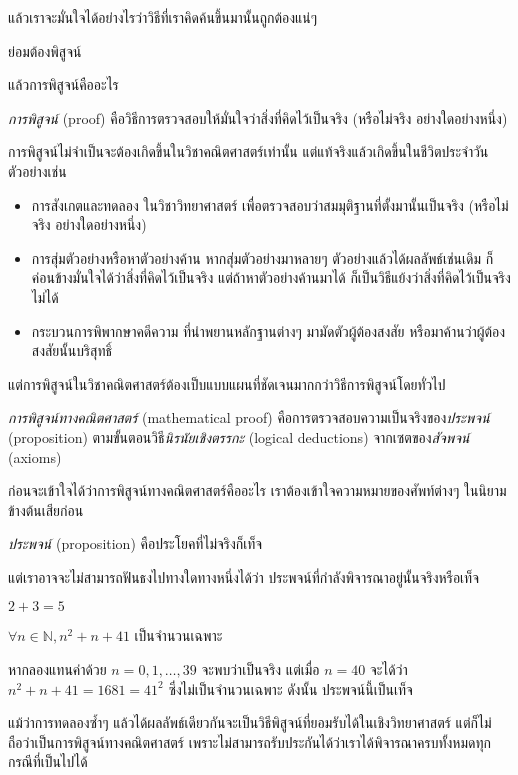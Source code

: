 แล้วเราจะมั่นใจได้อย่างไรว่าวิธีที่เราคิดค้นขึ้นมานั้นถูกต้องแน่ๆ

ย่อมต้องพิสูจน์

แล้วการพิสูจน์คืออะไร

\begin{definition}
\emph{การพิสูจน์} (proof) คือวิธีการตรวจสอบให้มั่นใจว่าสิ่งที่คิดไว้เป็นจริง (หรือไม่จริง อย่างใดอย่างหนึ่ง)
\end{definition}

การพิสูจน์ไม่จำเป็นจะต้องเกิดขึ้นในวิชาคณิตศาสตร์เท่านั้น แต่แท้จริงแล้วเกิดขึ้นในชีวิตประจำวัน ตัวอย่างเช่น
\begin{itemize}
\item การสังเกตและทดลอง ในวิชาวิทยาศาสตร์ เพื่อตรวจสอบว่าสมมุติฐานที่ตั้งมานั้นเป็นจริง (หรือไม่จริง อย่างใดอย่างหนึ่ง)

\item การสุ่มตัวอย่างหรือหาตัวอย่างค้าน หากสุ่มตัวอย่างมาหลายๆ ตัวอย่างแล้วได้ผลลัพธ์เช่นเดิม ก็ค่อนข้างมั่นใจได้ว่าสิ่งที่คิดไว้เป็นจริง แต่ถ้าหาตัวอย่างค้านมาได้ ก็เป็นวิธีแย้งว่าสิ่งที่คิดไว้เป็นจริงไม่ได้

\item กระบวนการพิพากษาคดีความ ที่นำพยานหลักฐานต่างๆ มามัดตัวผู้ต้องสงสัย หรือมาค้านว่าผู้ต้องสงสัยนั้นบริสุทธิ์
\end{itemize}
แต่การพิสูจน์ในวิชาคณิตศาสตร์ต้องเป็บแบบแผนที่ชัดเจนมากกว่าวิธีการพิสูจน์โดยทั่วไป
\begin{definition}
\emph{การพิสูจน์ทางคณิตศาสตร์} (mathematical proof) คือการตรวจสอบความเป็นจริงของ\emph{ประ\-พจน์} (proposition) ตามขั้นตอนวิธี\emph{นิรนัยเชิงตรรกะ} (logical deductions) จากเซตของ\emph{สัจพจน์} (axioms)
\end{definition}
ก่อนจะเข้าใจได้ว่าการพิสูจน์ทางคณิตศาสตร์คืออะไร เราต้องเข้าใจความหมายของศัพท์ต่างๆ ในนิยามข้างต้นเสียก่อน
\begin{definition}
\emph{ประพจน์} (proposition) คือประโยคที่ไม่จริงก็เท็จ
\end{definition}
แต่เราอาจจะไม่สามารถฟันธงไปทางใดทางหนึ่งได้ว่า ประพจน์ที่กำลังพิจารณาอยู่นั้นจริงหรือเท็จ
\begin{example}
$2+3=5$
\end{example}
\begin{example}
$\forall n\in\mathbb{N}, n^2+n+41$ เป็นจำนวนเฉพาะ
\end{example}
หากลองแทนค่าด้วย $n=0,1,\dots,39$ จะพบว่าเป็นจริง แต่เมื่อ $n=40$ จะได้ว่า $n^2+n+41=1681=41^2$ ซึ่งไม่เป็นจำนวนเฉพาะ ดังนั้น ประพจน์นี้เป็นเท็จ

แม้ว่าการทดลองซ้ำๆ แล้วได้ผลลัพธ์เดียวกันจะเป็นวิธีพิสูจน์ที่ยอมรับได้ในเชิงวิทยาศาสตร์ แต่ก็ไม่ถือว่าเป็นการพิสูจน์ทางคณิตศาสตร์ เพราะไม่สามารถรับประกันได้ว่าเราได้พิจารณาครบทั้งหมดทุกกรณีที่เป็นไปได้

